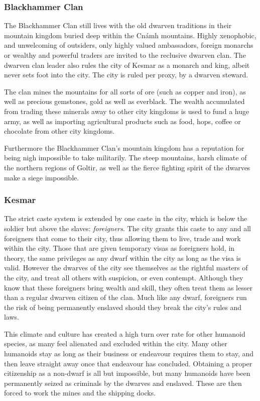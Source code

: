 \subsubsection*{Blackhammer Clan}

The Blackhammer Clan still lives with the old dwarven traditions in their
mountain kingdom buried deep within the Cnámh mountains. Highly xenophobic,
and unwelcoming of outsiders, only highly valued ambassadors, foreign monarchs
or wealthy and powerful traders are invited to the reclusive dwarven clan. The
dwarven clan leader also rules the city of Kesmar as a monarch and king,
albeit never sets foot into the city. The city is ruled per proxy, by a
dwarven steward.

The clan mines the mountains for all sorts of ore (such as copper and iron),
as well as precious gemstones, gold as well as everblack. The wealth
accumulated from trading these minerals away to other city kingdoms is used to
fund a huge army, as well as importing agricultural products such as food,
hops, coffee or chocolate from other city kingdoms.

Furthermore the Blackhammer Clan's mountain kingdom has a reputation for being
nigh impossible to take militarily. The steep mountains, harsh climate of the
northern regions of Goltir, as well as the fierce fighting spirit of the dwarves
make a siege impossible.

\subsubsection*{Kesmar}

The strict caste system is extended by one caste in the city, which is below
the soldier but above the slaves: \emph{foreigners}. The city grants this
caste to any and all foreigners that come to their city, thus allowing them to
live, trade and work within the city. Those that are given temporary visas as
foreigners hold, in theory, the same privileges as any dwarf within the city
as long as the visa is valid. However the dwarves of the city see themselves
as the rightful masters of the city, and treat all others with suspicion, or
even contempt. Although they know that these foreigners bring wealth and skill,
they often treat them as lesser than a regular dwarven citizen of the clan.
Much like any dwarf, foreigners run the risk of being permanently enslaved
should they break the city's rules and laws.

This climate and culture has created a high turn over rate for other humanoid
species, as many feel alienated and excluded within the city. Many other
humanoids stay as long as their business or endeavour requires them to stay,
and then leave straight away once that endeavour has concluded. Obtaining a
proper citizenship as a non-dwarf is all but impossible, but many humanoids
have been permanently seized as criminals by the dwarves and enslaved. These
are then forced to work the mines and the shipping docks.

